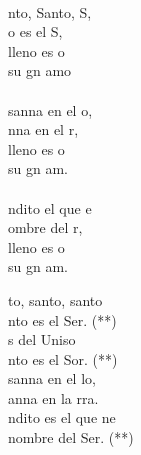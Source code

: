 \documentclass[12pt]{article}
\begin{document}
\begin{multicols*}{2}
\begin{cancion}[Santo][Mocedades]%
{}\vspace*{-0.4cm}\\
	nto, Santo, S,\\
	o es el S,\\
	lleno es  o \\
	 su gn amo\\
\jump
	 \chord{}{-}{ }  \chord{(}{**)}{    }\\
	sanna en el o,\\
	nna en el r,\\
	lleno es  o \\
	 su gn am.\\
\jump
	 \chord{}{-}{ }  \chord{(}{**)}{    }\\
	ndito el que e\\
	ombre del r,\\
	lleno es  o \\
	 su gn am. \\
\end{cancion}%

\begin{cancion}[Santo][Peruano]%
	to, santo, santo\\
	nto es el Ser. (**)\\
\jump
	s del Uniso\\
	nto es el Sor. (**)\\
\jump
	sanna en el lo,\\
	anna en la rra.\\
	ndito es el que ne\\
	nombre del Ser. (**)\\
\end{cancion}%


\end{multicols*}
\end{document}
